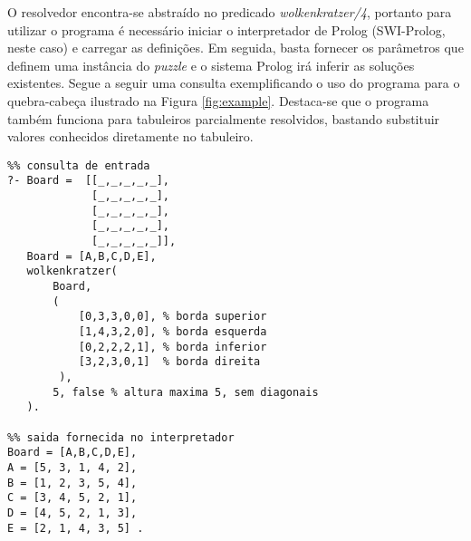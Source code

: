 O resolvedor encontra-se abstraído no predicado \textit{wolkenkratzer/4}, portanto para utilizar o programa é necessário iniciar o interpretador de Prolog (SWI-Prolog, neste caso) e carregar as definições.
Em seguida, basta fornecer os parâmetros que definem uma instância do \textit{puzzle} e o sistema Prolog irá inferir as soluções existentes.
Segue a seguir uma consulta exemplificando o uso do programa para o quebra-cabeça ilustrado na Figura \ref{fig:example}.
Destaca-se que o programa também funciona para tabuleiros parcialmente resolvidos, bastando substituir valores conhecidos diretamente no tabuleiro.

\begin{verbatim}
%% consulta de entrada
?- Board =  [[_,_,_,_,_],
             [_,_,_,_,_],
             [_,_,_,_,_],
             [_,_,_,_,_],
             [_,_,_,_,_]],
   Board = [A,B,C,D,E],
   wolkenkratzer(
       Board,
       (
           [0,3,3,0,0], % borda superior
           [1,4,3,2,0], % borda esquerda
           [0,2,2,2,1], % borda inferior
           [3,2,3,0,1]  % borda direita
        ),
       5, false % altura maxima 5, sem diagonais
   ).

%% saida fornecida no interpretador
Board = [A,B,C,D,E],
A = [5, 3, 1, 4, 2],
B = [1, 2, 3, 5, 4],
C = [3, 4, 5, 2, 1],
D = [4, 5, 2, 1, 3],
E = [2, 1, 4, 3, 5] .
\end{verbatim}
